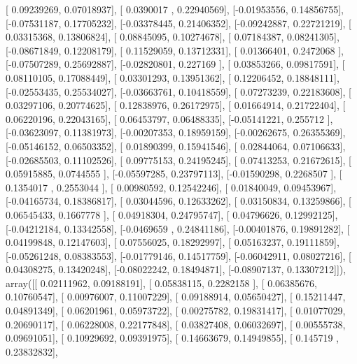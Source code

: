 \documentclass{article}
\begin{document}
       [ 0.09239269,  0.07018937],
       [ 0.0390017 ,  0.22940569],
       [-0.01953556,  0.14856755],
       [-0.07531187,  0.17705232],
       [-0.03378445,  0.21406352],
       [-0.09242887,  0.22721219],
       [ 0.03315368,  0.13806824],
       [ 0.08845095,  0.10274678],
       [ 0.07184387,  0.08241305],
       [-0.08671849,  0.12208179],
       [ 0.11529059,  0.13712331],
       [ 0.01366401,  0.2472068 ],
       [-0.07507289,  0.25692887],
       [-0.02820801,  0.227169  ],
       [ 0.03853266,  0.09817591],
       [ 0.08110105,  0.17088449],
       [ 0.03301293,  0.13951362],
       [ 0.12206452,  0.18848111],
       [-0.02553435,  0.25534027],
       [-0.03663761,  0.10418559],
       [ 0.07273239,  0.22183608],
       [ 0.03297106,  0.20774625],
       [ 0.12838976,  0.26172975],
       [ 0.01664914,  0.21722404],
       [ 0.06220196,  0.22043165],
       [ 0.06453797,  0.06488335],
       [-0.05141221,  0.255712  ],
       [-0.03623097,  0.11381973],
       [-0.00207353,  0.18959159],
       [-0.00262675,  0.26355369],
       [-0.05146152,  0.06503352],
       [ 0.01890399,  0.15941546],
       [ 0.02844064,  0.07106633],
       [-0.02685503,  0.11102526],
       [ 0.09775153,  0.24195245],
       [ 0.07413253,  0.21672615],
       [ 0.05915885,  0.0744555 ],
       [-0.05597285,  0.23797113],
       [-0.01590298,  0.2268507 ],
       [ 0.1354017 ,  0.2553044 ],
       [ 0.00980592,  0.12542246],
       [ 0.01840049,  0.09453967],
       [-0.04165734,  0.18386817],
       [ 0.03044596,  0.12633262],
       [ 0.03150834,  0.13259866],
       [ 0.06545433,  0.1667778 ],
       [ 0.04918304,  0.24795747],
       [ 0.04796626,  0.12992125],
       [-0.04212184,  0.13342558],
       [-0.0469659 ,  0.24841186],
       [-0.00401876,  0.19891282],
       [ 0.04199848,  0.12147603],
       [ 0.07556025,  0.18292997],
       [ 0.05163237,  0.19111859],
       [-0.05261248,  0.08383553],
       [-0.01779146,  0.14517759],
       [-0.06042911,  0.08027216],
       [ 0.04308275,  0.13420248],
       [-0.08022242,  0.18494871],
       [-0.08907137,  0.13307212]]), array([[ 0.02111962,  0.09188191],
       [ 0.05838115,  0.2282158 ],
       [ 0.06385676,  0.10760547],
       [ 0.00976007,  0.11007229],
       [ 0.09188914,  0.05650427],
       [ 0.15211447,  0.04891349],
       [ 0.06201961,  0.05973722],
       [ 0.00275782,  0.19831417],
       [ 0.01077029,  0.20690117],
       [ 0.06228008,  0.22177848],
       [ 0.03827408,  0.06032697],
       [ 0.00555738,  0.09691051],
       [ 0.10929692,  0.09391975],
       [ 0.14663679,  0.14949855],
       [ 0.145719  ,  0.23832832],
\end{document}
